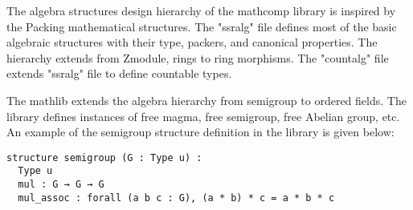 The algebra structures design hierarchy of the mathcomp library is inspired by
the Packing mathematical structures. The "ssralg" file defines most of the basic
algebraic structures with their type, packers, and canonical properties. The
hierarchy extends from Zmodule, rings to ring morphisms. The "countalg" file
extends "ssralg" file to define countable types.

The mathlib extends the algebra hierarchy from semigroup to ordered fields. The
library defines instances of free magma, free semigroup, free Abelian group,
etc. An example of the semigroup structure definition in the library is given below:

\begin{verbatim}
structure semigroup (G : Type u) :
  Type u  
  mul : G → G → G 
  mul_assoc : forall (a b c : G), (a * b) * c = a * b * c
\end{verbatim}

